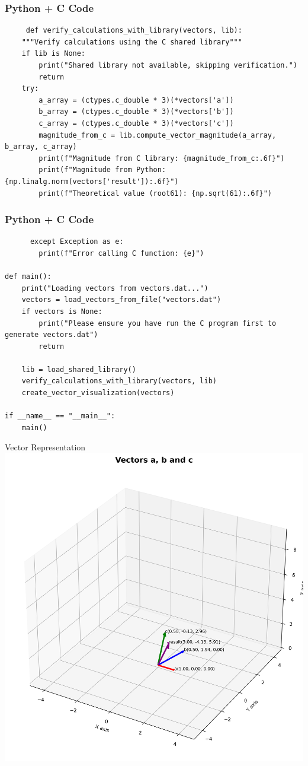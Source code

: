 \documentclass{beamer}
\begin{document}
\begin{frame}[fragile]
    \frametitle{Python + C Code}
    \begin{lstlisting}
     def verify_calculations_with_library(vectors, lib):
    """Verify calculations using the C shared library"""
    if lib is None:
        print("Shared library not available, skipping verification.")
        return
    try:
        a_array = (ctypes.c_double * 3)(*vectors['a'])
        b_array = (ctypes.c_double * 3)(*vectors['b'])
        c_array = (ctypes.c_double * 3)(*vectors['c'])
        magnitude_from_c = lib.compute_vector_magnitude(a_array, b_array, c_array)
        print(f"Magnitude from C library: {magnitude_from_c:.6f}")
        print(f"Magnitude from Python: {np.linalg.norm(vectors['result']):.6f}")
        print(f"Theoretical value (root61): {np.sqrt(61):.6f}")
    \end{lstlisting}
\end{frame}

\begin{frame}[fragile]
    \frametitle{Python + C Code}
    \begin{lstlisting}
      except Exception as e:
        print(f"Error calling C function: {e}")

def main():
    print("Loading vectors from vectors.dat...")
    vectors = load_vectors_from_file("vectors.dat")
    if vectors is None:
        print("Please ensure you have run the C program first to generate vectors.dat")
        return

    lib = load_shared_library()
    verify_calculations_with_library(vectors, lib)
    create_vector_visualization(vectors)

if __name__ == "__main__":
    main()
    \end{lstlisting}
\end{frame}


\begin{frame}{Vector Representation}
   \centering
    \includegraphics[width=\columnwidth, height=0.8\textheight, keepaspectratio]{figs/fig1.png}
    \label{fig:Beamer/figs/fig1.png}
\end{frame}
\end{document}
